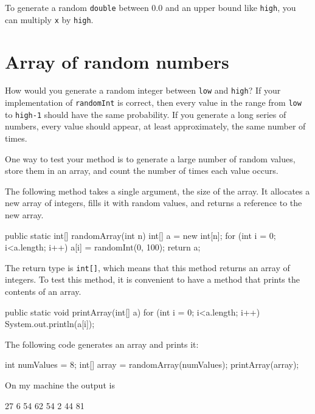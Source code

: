 To generate a random {\tt double} between 0.0 and an upper bound like
{\tt high}, you can multiply {\tt x} by {\tt high}.


\section{Array of random numbers}
\label{randarray}

How would you generate a random integer between {\tt low} and {\tt high}?
If your implementation of {\tt randomInt} is correct, then
every value in the range from {\tt low} to {\tt high-1} should
have the same probability.  If you generate a long series
of numbers, every value should appear, at least approximately,
the same number of times.

One way to test your method is to
generate a large number of random values,
store them in an array, and count the number of times each
value occurs.

The following method takes a single argument, the size of
the array.  It allocates a new array of integers, fills
it with random values, and returns a reference to the new
array.

\begin{code}
  public static int[] randomArray(int n) {
      int[] a = new int[n];
      for (int i = 0; i<a.length; i++) {
          a[i] = randomInt(0, 100);
      }
      return a;
  }
\end{code}

The return type is {\tt int[]}, which means that
this method returns an array of integers.
To test this method, it is convenient to have a method that
prints the contents of an array.

\begin{code}
  public static void printArray(int[] a) {
      for (int i = 0; i<a.length; i++) {
          System.out.println(a[i]);
      }
  }
\end{code}

The following code generates an array and prints it:

\begin{code}
    int numValues = 8;
    int[] array = randomArray(numValues);
    printArray(array);
\end{code}

On my machine the output is

\begin{stdout}
27
6
54
62
54
2
44
81
\end{stdout}

